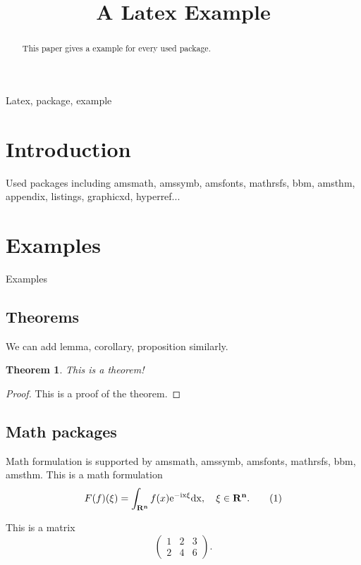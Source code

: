 \documentclass{article}
\title{A Latex Example}
\newtheorem{theorem}{Theorem}
\begin{document}
    \maketitle %

    \begin{abstract}
        This paper gives a example for every used package.
    \end{abstract}

    \begin{keywords}
        Latex, package, example
    \end{keywords}

    \section{Introduction}
    Used packages including amsmath, amssymb, amsfonts, mathrsfs, bbm, amsthm, appendix, listings, graphicxd, hyperref...

    \section{Examples}
    Examples

    \subsection{Theorems}
    We can add lemma, corollary, proposition similarly.
    \begin{theorem}
        This is a theorem!
        \label{theorem_1}
    \end{theorem}
    \begin{proof}
        This is a proof of the theorem.
    \end{proof}

    \subsection{Math packages}
    Math formulation is supported by amsmath, amssymb, amsfonts, mathrsfs, bbm, amsthm.
    This is a math formulation
    \begin{align}
        F(f)(\xi)=\int_{\bf{R}^n} f(x)\rm e^{-\rm i x\xi}\rm dx,\quad \xi\in\bf{R}^n. \tag{1}
    \end{align}

    This is a matrix
    $$
    \begin{pmatrix}
        1 & 2 & 3\\
        2 & 4 & 6
    \end{pmatrix}.
    $$
    
\end{document}
